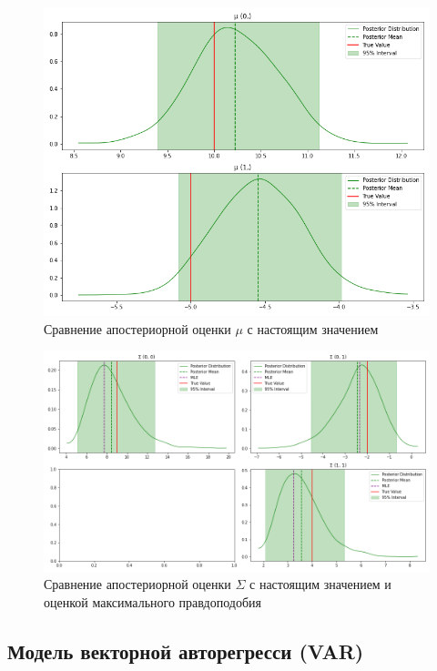 \documentclass[a4paper,14pt]{extreport}
\begin{document}
\begin{figure}[H]
	\includegraphics[width=\linewidth]{img/gen/pp_mvn_mu_hdi.png}
	\caption{Сравнение апостериорной оценки $\mu$ с настоящим значением}
	\label{fig:pp_mvn_mu_hdi}
\end{figure}

\begin{figure}[H]
	\includegraphics[width=\linewidth]{img/gen/pp_mvn_sigma_hdi.png}
	\caption{Сравнение апостериорной оценки $\Sigma$ с настоящим значением и оценкой максимального правдоподобия}
	\label{fig:pp_mvn_sigma_hdi}
\end{figure}


\subsection{Модель векторной авторегресси (VAR)}
\end{document}
